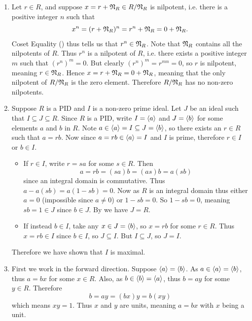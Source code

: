 \begin{enumerate}
    \item Let $r \in R$, and suppose $x = r + \mathfrak{N}_{R} \in R/\mathfrak{N}_{R}$ is nilpotent, i.e. there is a positive integer $n$ such that
    \[
        x^n = (r + \mathfrak{N}_{R})^n = r^n + \mathfrak{N}_{R} = 0 + \mathfrak{N}_{R}.
    \]
    Coset Equality () thus tells us that $r^n \in \mathfrak{N}_{R}$. Note that $\mathfrak{N}_{R}$ contains all the nilpotents of $R$. Thus $r^n$ is a nilpotent of $R$, i.e. there exists a positive integer $m$ such that $(r^n)^m = 0$. But clearly $(r^n)^m = r^{mn} = 0$, so $r$ is nilpotent, meaning $r \in \mathfrak{N}_{R}$. Hence $x = r + \mathfrak{N}_{R} = 0 + \mathfrak{N}_{R}$, meaning that the only nilpotent of $R/\mathfrak{N}_{R}$ is the zero element. Therefore $R/\mathfrak{N}_{R}$ has no non-zero nilpotents.

    \item Suppose $R$ is a PID and $I$ is a non-zero prime ideal. Let $J$ be an ideal such that $I \subseteq J \subseteq R$. Since $R$ is a PID, write $I = \left\langle a\right\rangle$ and $J = \left\langle b\right\rangle$ for some elements $a$ and $b$ in $R$. Note $a \in \left\langle a\right\rangle = I \subseteq J = \left\langle b\right\rangle$, so there exists an $r \in R$ such that $a = rb$. Now since $a = rb \in \left\langle a\right\rangle = I$ and $I$ is prime, therefore $r \in I$ or $b \in I$.
    \begin{itemize}
        \item If $r \in I$, write $r = sa$ for some $s \in R$. Then
        \[
            a = rb = (sa)b = (as)b = a(sb)
        \]
        since an integral domain is commutative. Thus $a - a(sb) = a(1-sb) = 0$. Now as $R$ is an integral domain thus either $a = 0$ (impossible since $a \neq 0$) or $1-sb = 0$. So $1-sb = 0$, meaning $sb = 1 \in J$ since $b \in J$. By  we have $J = R$.
        \item If instead $b \in I$, take any $x \in J = \left\langle b\right\rangle$, so $x = rb$ for some $r \in R$. Thus $x = rb \in I$ since $b \in I$, so $J \subseteq I$. But $I \subseteq J$, so $J = I$.
    \end{itemize}
    Therefore we have shown that $I$ is maximal.

    \item First we work in the forward direction. Suppose $\left\langle a\right\rangle = \left\langle b\right\rangle$. As $a \in \left\langle a\right\rangle = \left\langle b\right\rangle$, thus $a = bx$ for some $x \in R$. Also, as $b \in \left\langle b\right\rangle = \left\langle a\right\rangle$, thus $b = ay$ for some $y \in R$. Therefore
    \[
        b = ay = (bx)y = b(xy)
    \]
    which means $xy = 1$. Thus $x$ and $y$ are units, meaning $a = bx$ with $x$ being a unit.


\end{enumerate}
